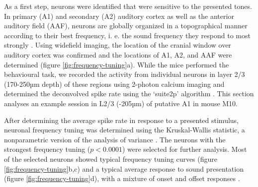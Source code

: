 \documentclass[]{report}
\theoremstyle{definition}
\theoremstyle{definition}
\theoremstyle{definition}
\theoremstyle{remark}
\begin{document}
As a first step, neurons were identified that were sensitive to the
presented tones. In primary (A1) and secondary (A2) auditory cortex as
well as the anterior auditory field (AAF), neurons are globally
organized in a topographical manner according to their best frequency,
i. e. the sound frequency they respond to most strongly
\citep{stiebler1997topographic, bizley2005functional, issa2014topographic}.
Using widefield imaging, the location of the cranial window over
auditory cortex was confirmed and the locations of A1, A2, and AAF were
determined (figure \ref{fig:frequency-tuning}a). While the mice
performed the behavioural task, we recorded the activity from individual
neurons in layer 2/3 (170-250µm depth) of these regions using 2-photon
calcium imaging and determined the deconvolved spike rate using the
`suite2p' algorithm \citep{pachitariu2017suite2p}. This section analyses
an example session in L2/3 (-205µm) of putative A1 in mouse M10.

After determining the average spike rate in response to a presented
stimulus, neuronal frequency tuning was determined using the
Kruskal-Wallis statistic, a nonparametric version of the analysis of
variance \citep{kruskal1952}. The neurons with the strongest frequency
tuning (\(p<0.0001\)) were selected for further analysis. Most of the
selected neurons showed typical frequency tuning curves (figure
\ref{fig:frequency-tuning}b,c) and a typical average response to sound
presentation (figure \ref{fig:frequency-tuning}d), with a mixture of
onset and offset responses \citep{qin2007offset, liu2019offset}.
\end{document}
